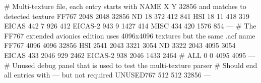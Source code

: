 # Multi-texture file, each entry starts with NAME X Y 32856 and matches to detected texture
FF767 2048 2048 32856
ND       18  372  412  841
HSI      18   11  418  319
EICAS   442    7  926  412
EICAS-2 943    9 1427  414
MISC    434  420 1576  854
---
# The FF767 extended avionics edition uses 4096x4096 textures but the same .acf name
FF767 4096 4096 32856
HSI    2541 2043 3321 3054
ND     3322 2043 4095 3054
EICAS   433 2046  929 2462
EICAS-2 938 2046 1433 2464
# ALL       0    0 4095 4095
---
# Unused debug panel that is used to test the multi-texture parser
# Should end all entries with --- but not required
UNUSED767 512 512 32856
---
